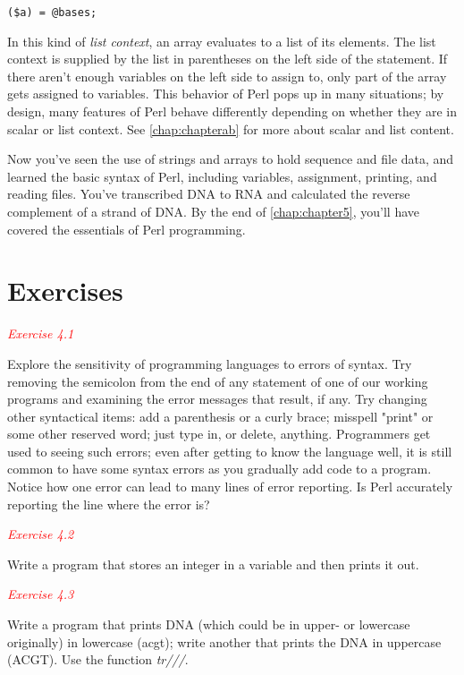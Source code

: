 \begin{lstlisting}
($a) = @bases;
\end{lstlisting}

In this kind of \textit{list context}, an array evaluates to a list of its elements. The list context is supplied by the list in parentheses on the left side of the statement. If there aren't enough variables on the left side to assign to, only part of the array gets assigned to variables. This behavior of Perl pops up in many situations; by design, many features of Perl behave differently depending on whether they are in scalar or list context. See \autoref{chap:chapterab} for more about scalar and list content.

Now you've seen the use of strings and arrays to hold sequence and file data, and learned the basic syntax of Perl, including variables, assignment, printing, and reading files. You've transcribed DNA to RNA and calculated the reverse complement of a strand of DNA. By the end of \autoref{chap:chapter5}, you'll have covered the essentials of Perl programming. 

\section{Exercises}
\textcolor{red}{\textit{Exercise 4.1}}
\begin{adjustwidth}{1cm}{}
Explore the sensitivity of programming languages to errors of syntax. Try removing the semicolon from the end of any statement of one of our working programs and examining the error messages that result, if any.  Try changing other syntactical items: add a parenthesis or a curly brace; misspell "print" or some other reserved word; just type in, or delete, anything. Programmers get used to seeing such errors; even after getting to know the language well, it is still common to have some syntax errors as you gradually add code to a program. Notice how one error can lead to many lines of error reporting. Is Perl accurately reporting the line where the error is? 
\end{adjustwidth}

\textcolor{red}{\textit{Exercise 4.2}}
\begin{adjustwidth}{1cm}{}
Write a program that stores an integer in a variable and then prints it out. 
\end{adjustwidth}

\textcolor{red}{\textit{Exercise 4.3}}
\begin{adjustwidth}{1cm}{}
Write a program that prints DNA (which could be in upper- or lowercase originally) in lowercase (acgt); write another that prints the DNA in uppercase (ACGT). Use the function \textit{tr///}. 
\end{adjustwidth}

